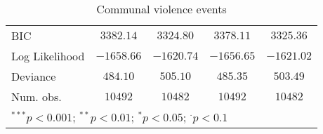 \begin{sidewaystable}
\begin{center}
{\begin{tabular}{l c c c c}
BIC                               & $3382.14$     & $3324.80$      & $3378.11$     & $3325.36$     \\
Log Likelihood                    & $-1658.66$    & $-1620.74$     & $-1656.65$    & $-1621.02$    \\
Deviance                          & $484.10$      & $505.10$       & $485.35$      & $503.49$      \\
Num. obs.                         & $10492$       & $10482$        & $10492$       & $10482$       \\
\hline
\multicolumn{5}{l}{\scriptsize{$^{***}p<0.001$; $^{**}p<0.01$; $^{*}p<0.05$; $^{\cdot}p<0.1$}}
\end{tabular}
}
\caption{Communal violence events}
\label{org3}
\end{center}
\end{sidewaystable}

